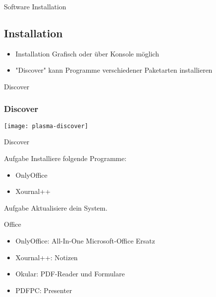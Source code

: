 \begin{frame}{Software Installation}
    \subsection{Installation}\label{subsec:installation}
    \pause
    \begin{itemize}
        \item Installation Grafisch oder über Konsole möglich\pause
        \item "Discover" kann Programme verschiedener Paketarten installieren
    \end{itemize}

\end{frame}

\begin{frame}{Discover}
    \subsubsection{Discover}\label{subsubsec:discover}

    \texttt{[image: plasma-discover]}
\end{frame}

\begin{frame}{Discover}

    \vspace{0.5cm}
    \begin{alertblock}{Aufgabe}
        Installiere folgende Programme:
        \pause
        \begin{itemize}
            \item OnlyOffice\pause
            \item Xournal++
        \end{itemize}
    \end{alertblock}
    \pause

    \vspace{0.5cm}
    \begin{alertblock}{Aufgabe}
        Aktualisiere dein System.
    \end{alertblock}

\end{frame}

\begin{frame}{Office}
    \pause

    \begin{itemize}
        \item OnlyOffice: All-In-One Microsoft-Office Ersatz\pause
        \item Xournal++: Notizen\pause
        \item Okular: PDF-Reader und Formulare\pause
        \item PDFPC: Presenter
    \end{itemize}

\end{frame}


